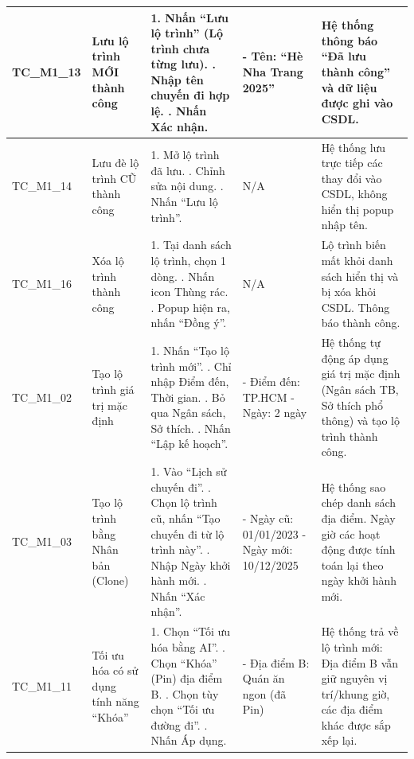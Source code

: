 \begin{landscape}
\begin{longtable}{|p{2.5cm}|p{4.0cm}|p{6.5cm}|p{4.5cm}|p{4.5cm}|}
TC\_M1\_13 & Lưu lộ trình MỚI thành công & 
1. Nhấn ``Lưu lộ trình'' (Lộ trình chưa từng lưu). \newline 
2. Nhập tên chuyến đi hợp lệ. \newline 
3. Nhấn Xác nhận. & 
- Tên: ``Hè Nha Trang 2025'' & 
Hệ thống thông báo ``Đã lưu thành công'' và dữ liệu được ghi vào CSDL. \\
\hline

TC\_M1\_14 & Lưu đè lộ trình CŨ thành công & 
1. Mở lộ trình đã lưu. \newline 
2. Chỉnh sửa nội dung. \newline 
3. Nhấn ``Lưu lộ trình''. & 
N/A & 
Hệ thống lưu trực tiếp các thay đổi vào CSDL, không hiển thị popup nhập tên. \\
\hline

TC\_M1\_16 & Xóa lộ trình thành công & 
1. Tại danh sách lộ trình, chọn 1 dòng. \newline 
2. Nhấn icon Thùng rác. \newline 
3. Popup hiện ra, nhấn ``Đồng ý''. & 
N/A & 
Lộ trình biến mất khỏi danh sách hiển thị và bị xóa khỏi CSDL. Thông báo thành công. \\
\hline

TC\_M1\_02 & Tạo lộ trình giá trị mặc định & 
1. Nhấn ``Tạo lộ trình mới''. \newline 
2. Chỉ nhập Điểm đến, Thời gian. \newline 
3. Bỏ qua Ngân sách, Sở thích. \newline 
4. Nhấn ``Lập kế hoạch''. & 
- Điểm đến: TP.HCM \newline 
- Ngày: 2 ngày & 
Hệ thống tự động áp dụng giá trị mặc định (Ngân sách TB, Sở thích phổ thông) và tạo lộ trình thành công. \\
\hline

TC\_M1\_03 & Tạo lộ trình bằng Nhân bản (Clone) & 
1. Vào ``Lịch sử chuyến đi''. \newline 
2. Chọn lộ trình cũ, nhấn ``Tạo chuyến đi từ lộ trình này''. \newline 
3. Nhập Ngày khởi hành mới. \newline 
4. Nhấn ``Xác nhận''. & 
- Ngày cũ: 01/01/2023 \newline 
- Ngày mới: 10/12/2025 & 
Hệ thống sao chép danh sách địa điểm. Ngày giờ các hoạt động được tính toán lại theo ngày khởi hành mới. \\
\hline

TC\_M1\_11 & Tối ưu hóa có sử dụng tính năng ``Khóa'' & 
1. Chọn ``Tối ưu hóa bằng AI''. \newline 
2. Chọn ``Khóa'' (Pin) địa điểm B. \newline 
3. Chọn tùy chọn ``Tối ưu đường đi''. \newline 
4. Nhấn Áp dụng. & 
- Địa điểm B: Quán ăn ngon (đã Pin) & 
Hệ thống trả về lộ trình mới: Địa điểm B vẫn giữ nguyên vị trí/khung giờ, các địa điểm khác được sắp xếp lại. \\
\hline


\end{longtable}
\end{landscape}
